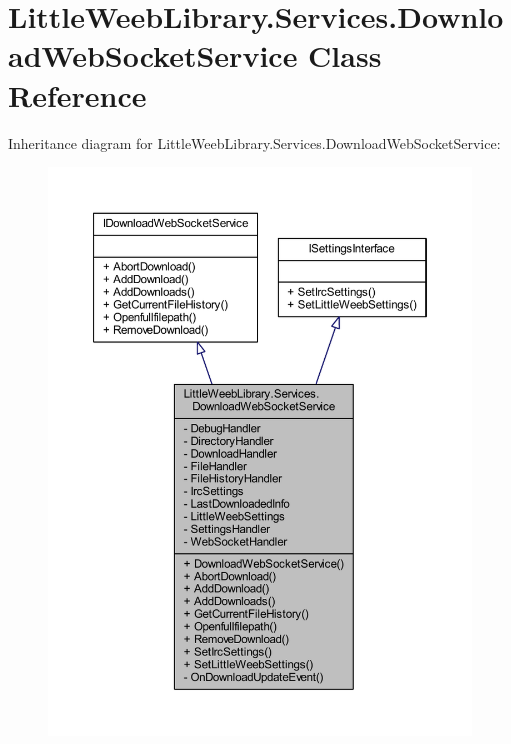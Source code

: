 \hypertarget{class_little_weeb_library_1_1_services_1_1_download_web_socket_service}{}\section{Little\+Weeb\+Library.\+Services.\+Download\+Web\+Socket\+Service Class Reference}
\label{class_little_weeb_library_1_1_services_1_1_download_web_socket_service}


Inheritance diagram for Little\+Weeb\+Library.\+Services.\+Download\+Web\+Socket\+Service\+:\nopagebreak
\begin{figure}[H]
\begin{center}
\leavevmode
\includegraphics[width=350pt]{class_little_weeb_library_1_1_services_1_1_download_web_socket_service__inherit__graph}
\end{center}
\end{figure}


